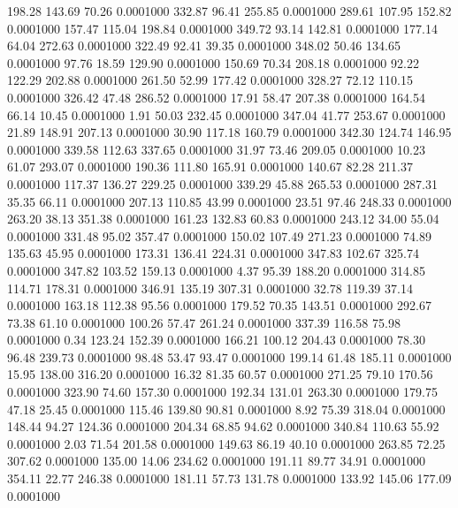  198.28  143.69   70.26   0.0001000
 332.87   96.41  255.85   0.0001000
 289.61  107.95  152.82   0.0001000
 157.47  115.04  198.84   0.0001000
 349.72   93.14  142.81   0.0001000
 177.14   64.04  272.63   0.0001000
 322.49   92.41   39.35   0.0001000
 348.02   50.46  134.65   0.0001000
  97.76   18.59  129.90   0.0001000
 150.69   70.34  208.18   0.0001000
  92.22  122.29  202.88   0.0001000
 261.50   52.99  177.42   0.0001000
 328.27   72.12  110.15   0.0001000
 326.42   47.48  286.52   0.0001000
  17.91   58.47  207.38   0.0001000
 164.54   66.14   10.45   0.0001000
   1.91   50.03  232.45   0.0001000
 347.04   41.77  253.67   0.0001000
  21.89  148.91  207.13   0.0001000
  30.90  117.18  160.79   0.0001000
 342.30  124.74  146.95   0.0001000
 339.58  112.63  337.65   0.0001000
  31.97   73.46  209.05   0.0001000
  10.23   61.07  293.07   0.0001000
 190.36  111.80  165.91   0.0001000
 140.67   82.28  211.37   0.0001000
 117.37  136.27  229.25   0.0001000
 339.29   45.88  265.53   0.0001000
 287.31   35.35   66.11   0.0001000
 207.13  110.85   43.99   0.0001000
  23.51   97.46  248.33   0.0001000
 263.20   38.13  351.38   0.0001000
 161.23  132.83   60.83   0.0001000
 243.12   34.00   55.04   0.0001000
 331.48   95.02  357.47   0.0001000
 150.02  107.49  271.23   0.0001000
  74.89  135.63   45.95   0.0001000
 173.31  136.41  224.31   0.0001000
 347.83  102.67  325.74   0.0001000
 347.82  103.52  159.13   0.0001000
   4.37   95.39  188.20   0.0001000
 314.85  114.71  178.31   0.0001000
 346.91  135.19  307.31   0.0001000
  32.78  119.39   37.14   0.0001000
 163.18  112.38   95.56   0.0001000
 179.52   70.35  143.51   0.0001000
 292.67   73.38   61.10   0.0001000
 100.26   57.47  261.24   0.0001000
 337.39  116.58   75.98   0.0001000
   0.34  123.24  152.39   0.0001000
 166.21  100.12  204.43   0.0001000
  78.30   96.48  239.73   0.0001000
  98.48   53.47   93.47   0.0001000
 199.14   61.48  185.11   0.0001000
  15.95  138.00  316.20   0.0001000
  16.32   81.35   60.57   0.0001000
 271.25   79.10  170.56   0.0001000
 323.90   74.60  157.30   0.0001000
 192.34  131.01  263.30   0.0001000
 179.75   47.18   25.45   0.0001000
 115.46  139.80   90.81   0.0001000
   8.92   75.39  318.04   0.0001000
 148.44   94.27  124.36   0.0001000
 204.34   68.85   94.62   0.0001000
 340.84  110.63   55.92   0.0001000
   2.03   71.54  201.58   0.0001000
 149.63   86.19   40.10   0.0001000
 263.85   72.25  307.62   0.0001000
 135.00   14.06  234.62   0.0001000
 191.11   89.77   34.91   0.0001000
 354.11   22.77  246.38   0.0001000
 181.11   57.73  131.78   0.0001000
 133.92  145.06  177.09   0.0001000
